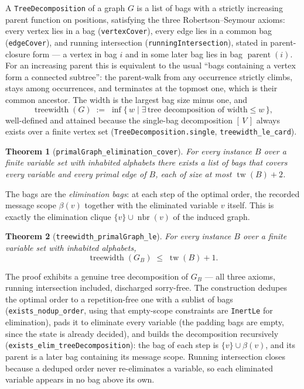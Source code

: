 \documentclass[11pt]{article}
\newtheorem{theorem}{Theorem}
\newcommand{\lean}[1]{\texttt{#1}}
\newcommand{\bagof}[1]{\beta(#1)}
\begin{document}
A \lean{TreeDecomposition} of a graph $G$ is a list of bags with a
strictly increasing parent function on positions, satisfying the three
Robertson--Seymour axioms: every vertex lies in a bag
(\lean{vertexCover}), every edge lies in a common bag
(\lean{edgeCover}), and running intersection
(\lean{runningIntersection}), stated in parent-closure form --- a vertex
in bag $i$ and in some later bag lies in bag $\operatorname{parent}(i)$.
For an increasing parent this is equivalent to the usual
``bags containing a vertex form a connected subtree'': the parent-walk
from any occurrence strictly climbs, stays among occurrences, and
terminates at the topmost one, which is their common ancestor.  The
width is the largest bag size minus one, and
\[
  \operatorname{treewidth}(G) \;:=\;
  \inf\{\, w \mid \exists\,\text{tree decomposition of width} \le w \,\},
\]
well-defined and attained because the single-bag decomposition
$[\,V\,]$ always exists over a finite vertex set
(\lean{TreeDecomposition.single}, \lean{treewidth\_le\_card}).

\begin{theorem}[\lean{primalGraph\_elimination\_cover}]
For every instance $B$ over a finite variable set with inhabited
alphabets there exists a list of bags that covers every variable and
every primal edge of $B$, each of size at most
$\operatorname{tw}(B) + 2$.
\end{theorem}

The bags are the \emph{elimination bags}: at each step of the optimal
order, the recorded message scope $\bagof{v}$ together with the
eliminated variable $v$ itself.  This is exactly the elimination clique
$\{v\} \cup \operatorname{nbr}(v)$ of the induced graph.

\begin{theorem}[\lean{treewidth\_primalGraph\_le}]
For every instance $B$ over a finite variable set with inhabited
alphabets,
\[
  \operatorname{treewidth}(G_B) \;\le\; \operatorname{tw}(B) + 1 .
\]
\end{theorem}

The proof exhibits a genuine tree decomposition of $G_B$ --- all three
axioms, running intersection included, discharged sorry-free.  The
construction dedupes the optimal order to a repetition-free one with a
sublist of bags (\lean{exists\_nodup\_order}, using that empty-scope
constraints are \lean{InertLe} for elimination), pads it to eliminate
every variable (the padding bags are empty, since the state is already
decided), and builds the decomposition recursively
(\lean{exists\_elim\_treeDecomposition}): the bag of each step is
$\{v\} \cup \bagof{v}$, and its parent is a later bag containing its
message scope.  Running intersection closes because a deduped order
never re-eliminates a variable, so each eliminated variable appears in
no bag above its own.
\end{document}
